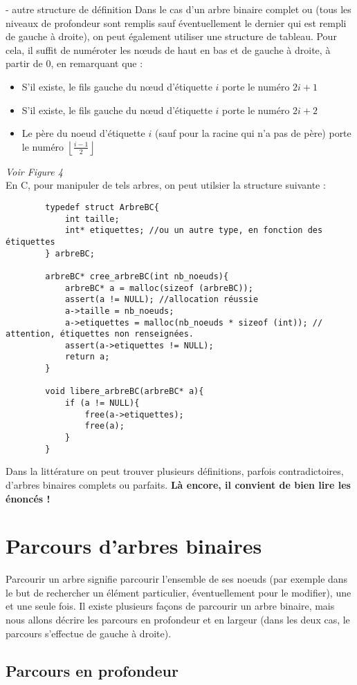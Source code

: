 \begin{exemple}{7.13}{ - autre structure de définition}
    Dans le cas d'un arbre binaire complet ou  (tous les niveaux de profondeur sont remplis sauf éventuellement le dernier qui est rempli de gauche à droite), on peut également utiliser une structure de tableau. Pour cela, il suffit de numéroter les nœuds de haut en bas et de gauche à droite, à partir de 0, en remarquant que : \begin{itemize}
        \item S'il existe, le fils gauche du nœud d'étiquette $i$ porte le numéro $2i + 1$
        \item S'il existe, le fils gauche du nœud d'étiquette $i$ porte le numéro $2i + 2$
        \item Le père du noeud d'étiquette $i$ (sauf pour la racine qui n'a pas de père) porte le numéro $\left\lfloor \frac{i-1}{2}\right\rfloor $
    \end{itemize}
    \textit{Voir Figure 4} \\ En C, pour manipuler de tels arbres, on peut utilsier la structure suivante :
    \begin{verbatim}
        typedef struct ArbreBC{
            int taille;
            int* etiquettes; //ou un autre type, en fonction des étiquettes
        } arbreBC;

        arbreBC* cree_arbreBC(int nb_noeuds){
            arbreBC* a = malloc(sizeof (arbreBC));
            assert(a != NULL); //allocation réussie
            a->taille = nb_noeuds;
            a->etiquettes = malloc(nb_noeuds * sizeof (int)); // attention, étiquettes non renseignées.
            assert(a->etiquettes != NULL);
            return a;
        }

        void libere_arbreBC(arbreBC* a){
            if (a != NULL){
                free(a->etiquettes);
                free(a);
            }
        }
    \end{verbatim}
\end{exemple}

 \begin{remarque}{7.14}{}
    Dans la littérature on peut trouver plusieurs définitions, parfois contradictoires, d'arbres binaires complets ou parfaits. \textbf{Là encore, il convient de bien lire les énoncés !}
 \end{remarque}

 \section{Parcours d'arbres binaires}
 Parcourir un arbre signifie parcourir l'ensemble de ses noeuds (par exemple dans le but de rechercher un élément particulier, éventuellement pour le modifier), une et une seule fois. Il existe plusieurs façons de parcourir un arbre binaire, mais nous allons décrire les parcours en profondeur et en largeur (dans les deux cas, le parcours s'effectue de gauche à droite).

 \subsection{Parcours en profondeur}
 \begin{definition}{7.15}{}
    
 \end{definition}



